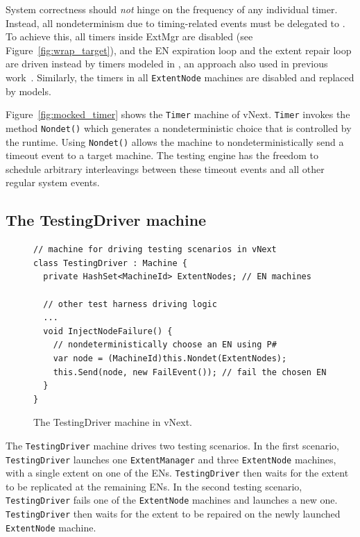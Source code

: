 System correctness should \emph{not} hinge on the frequency of any individual timer. Instead, all nondeterminism due to timing-related events must be delegated to \psharp. To achieve this, all timers inside ExtMgr are disabled (see Figure~\ref{fig:wrap_target}), and the EN expiration loop and the extent repair loop are driven instead by timers modeled in \psharp, an approach also used in previous work~\cite{desai2015building}. Similarly, the timers in all \texttt{ExtentNode} machines are disabled and replaced by \psharp models.

Figure~\ref{fig:mocked_timer} shows the \texttt{Timer} machine of vNext. \texttt{Timer} invokes the \psharp method \texttt{Nondet()} which generates a nondeterministic choice that is controlled by the \psharp runtime. Using \texttt{Nondet()} allows the machine to nondeterministically send a timeout event to a target machine. The \psharp testing engine has the freedom to schedule arbitrary interleavings between these timeout events and all other regular system events.

\subsection{The TestingDriver machine}
\label{sec:method:driver}

\begin{figure}[t]
\begin{lstlisting}
// machine for driving testing scenarios in vNext
class TestingDriver : Machine {
  private HashSet<MachineId> ExtentNodes; // EN machines
  
  // other test harness driving logic
  ...
  void InjectNodeFailure() {
    // nondeterministically choose an EN using P#
    var node = (MachineId)this.Nondet(ExtentNodes);    
    this.Send(node, new FailEvent()); // fail the chosen EN
  }
}
\end{lstlisting}
\vspace{-4mm}
\caption{The TestingDriver machine in vNext.}
\label{fig:testing_driver}
\vspace{-2mm}
\end{figure}

The \texttt{TestingDriver} machine drives two testing scenarios. In the first scenario, \texttt{TestingDriver} launches one \texttt{ExtentManager} and three \texttt{ExtentNode} machines, with a single extent on one of the ENs. \texttt{TestingDriver} then waits for the extent to be replicated at the remaining ENs. In the second testing scenario, \texttt{TestingDriver} fails one of the \texttt{ExtentNode} machines and launches a new one. \texttt{TestingDriver} then waits for the extent to be repaired on the newly launched \texttt{ExtentNode} machine.

